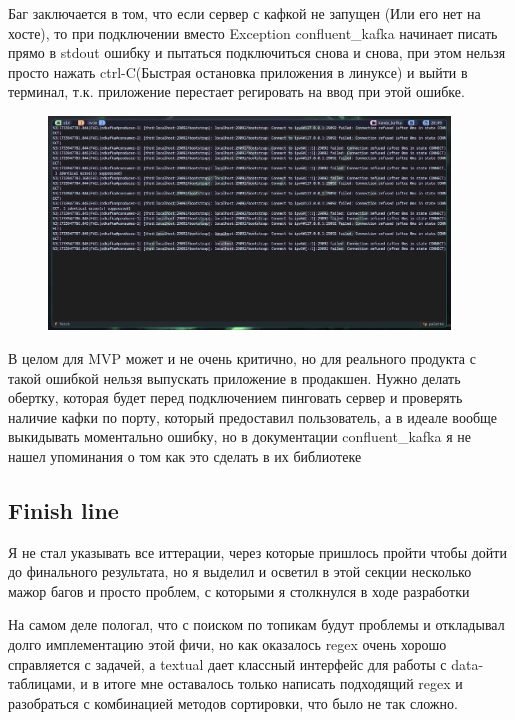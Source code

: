 \documentclass[10pt , a4paper]{report}
\begin{document}
Баг заключается в том, что если сервер с кафкой не запущен (Или его нет на хосте), то при подключении вместо Exception confluent\_kafka начинает писать прямо в stdout ошибку и пытаться подключиться снова и снова, при этом нельзя просто нажать ctrl-C(Быстрая остановка приложения в линуксе) и выйти в терминал, т.к. приложение перестает регировать на ввод при этой ошибке. 
\newpage
\begin{figure}[htbp]
  \begin{center}
    \includegraphics[width=0.95\textwidth]{imgs/BrokerConnectionError.png}
  \end{center}
  \caption{}\label{fig:}
\end{figure}

В целом для MVP может и не очень критично, но для реального продукта с такой ошибкой нельзя выпускать приложение в продакшен. Нужно делать обертку, которая будет перед подключением пинговать сервер и проверять наличие кафки по порту, который предоставил пользователь, а в идеале вообще выкидывать моментально ошибку, но в документации confluent\_kafka я не нашел упоминания о том как это сделать в их библиотеке 

\subsection{Finish line}

Я не стал указывать все иттерации, через которые пришлось пройти чтобы дойти до финального результата, но я выделил и осветил в этой секции несколько мажор багов и просто проблем, с которыми я столкнулся в ходе разработки

На самом деле пологал, что с поиском по топикам будут проблемы и откладывал долго имплементацию этой фичи, но как оказалось regex очень хорошо справляется с задачей, а textual дает классный интерфейс для работы с data-таблицами, и в итоге мне оставалось только написать подходящий regex и разобраться с комбинацией методов сортировки, что было не так сложно.
\end{document}
